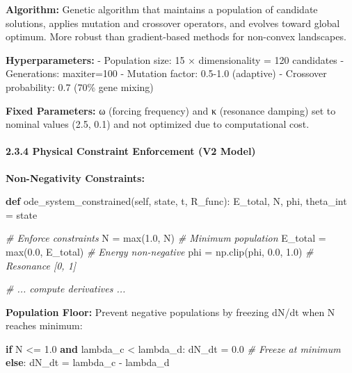 \documentclass[
]{article}
\newenvironment{Shaded}{}{}
\newcommand{\BuiltInTok}[1]{\textcolor[rgb]{0.00,0.50,0.00}{#1}}
\newcommand{\CommentTok}[1]{\textcolor[rgb]{0.38,0.63,0.69}{\textit{#1}}}
\newcommand{\ControlFlowTok}[1]{\textcolor[rgb]{0.00,0.44,0.13}{\textbf{#1}}}
\newcommand{\FloatTok}[1]{\textcolor[rgb]{0.25,0.63,0.44}{#1}}
\newcommand{\KeywordTok}[1]{\textcolor[rgb]{0.00,0.44,0.13}{\textbf{#1}}}
\newcommand{\NormalTok}[1]{#1}
\newcommand{\OperatorTok}[1]{\textcolor[rgb]{0.40,0.40,0.40}{#1}}
\newcommand{\VariableTok}[1]{\textcolor[rgb]{0.10,0.09,0.49}{#1}}
\begin{document}
\textbf{Algorithm:} Genetic algorithm that maintains a population of
candidate solutions, applies mutation and crossover operators, and
evolves toward global optimum. More robust than gradient-based methods
for non-convex landscapes.

\textbf{Hyperparameters:} - Population size: 15 × dimensionality = 120
candidates - Generations: maxiter=100 - Mutation factor: 0.5-1.0
(adaptive) - Crossover probability: 0.7 (70\% gene mixing)

\textbf{Fixed Parameters:} ω (forcing frequency) and κ (resonance
damping) set to nominal values (2.5, 0.1) and not optimized due to
computational cost.

\paragraph{2.3.4 Physical Constraint Enforcement (V2
Model)}\label{physical-constraint-enforcement-v2-model}

\textbf{Non-Negativity Constraints:}

\begin{Shaded}
\begin{Highlighting}[]
\KeywordTok{def}\NormalTok{ ode\_system\_constrained(}\VariableTok{self}\NormalTok{, state, t, R\_func):}
\NormalTok{    E\_total, N, phi, theta\_int }\OperatorTok{=}\NormalTok{ state}

    \CommentTok{\# Enforce constraints}
\NormalTok{    N }\OperatorTok{=} \BuiltInTok{max}\NormalTok{(}\FloatTok{1.0}\NormalTok{, N)              }\CommentTok{\# Minimum population}
\NormalTok{    E\_total }\OperatorTok{=} \BuiltInTok{max}\NormalTok{(}\FloatTok{0.0}\NormalTok{, E\_total)  }\CommentTok{\# Energy non{-}negative}
\NormalTok{    phi }\OperatorTok{=}\NormalTok{ np.clip(phi, }\FloatTok{0.0}\NormalTok{, }\FloatTok{1.0}\NormalTok{) }\CommentTok{\# Resonance [0, 1]}

    \CommentTok{\# ... compute derivatives ...}
\end{Highlighting}
\end{Shaded}

\textbf{Population Floor:} Prevent negative populations by freezing
dN/dt when N reaches minimum:

\begin{Shaded}
\begin{Highlighting}[]
\ControlFlowTok{if}\NormalTok{ N }\OperatorTok{\textless{}=} \FloatTok{1.0} \KeywordTok{and}\NormalTok{ lambda\_c }\OperatorTok{\textless{}}\NormalTok{ lambda\_d:}
\NormalTok{    dN\_dt }\OperatorTok{=} \FloatTok{0.0}  \CommentTok{\# Freeze at minimum}
\ControlFlowTok{else}\NormalTok{:}
\NormalTok{    dN\_dt }\OperatorTok{=}\NormalTok{ lambda\_c }\OperatorTok{{-}}\NormalTok{ lambda\_d}
\end{Highlighting}
\end{Shaded}
\end{document}
